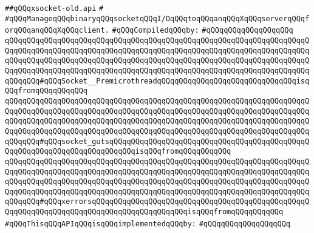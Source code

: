 \label{src/lib/x-kit/xclient/src/wire/xsocket-old.api}
\verb|##qQQqxsocket-old.api|\newline
\verb|#|\newline
\verb|#qQQqManageqQQqbinaryqQQqsocketqQQqI/OqQQqtoqQQqanqQQqXqQQqserverqQQqforqQQqanqQQqXqQQqclient.|\newline
\newline
\verb|#qQQqCompiledqQQqby:|\newline
\verb|#qQQqqQQqqQQqqQQqqQQq|\newline
\newline
\verb|qQQqqQQqqQQqqQQqqQQqqQQqqQQqqQQqqQQqqQQqqQQqqQQqqQQqqQQqqQQqqQQqqQQqqQQqqQQqqQQqqQQqqQQqqQQqqQQqqQQqqQQqqQQqqQQqqQQqqQQqqQQqqQQqqQQqqQQqqQQqqQQqqQQqqQQqqQQqqQQqqQQqqQQqqQQqqQQqqQQqqQQqqQQqqQQqqQQqqQQqqQQqqQQqqQQqqQQqqQQqqQQqqQQqqQQqqQQqqQQqqQQqqQQqqQQqqQQqqQQqqQQqqQQqqQQqqQQqqQQqqQQqqQQq#qQQqSocket__PremicrothreadqQQqqQQqqQQqqQQqqQQqqQQqqQQqqQQqisqQQqfromqQQqqQQqqQQq|\newline
\verb|qQQqqQQqqQQqqQQqqQQqqQQqqQQqqQQqqQQqqQQqqQQqqQQqqQQqqQQqqQQqqQQqqQQqqQQqqQQqqQQqqQQqqQQqqQQqqQQqqQQqqQQqqQQqqQQqqQQqqQQqqQQqqQQqqQQqqQQqqQQqqQQqqQQqqQQqqQQqqQQqqQQqqQQqqQQqqQQqqQQqqQQqqQQqqQQqqQQqqQQqqQQqqQQqqQQqqQQqqQQqqQQqqQQqqQQqqQQqqQQqqQQqqQQqqQQqqQQqqQQqqQQqqQQqqQQqqQQqqQQqqQQqqQQq#qQQqsocket_gutsqQQqqQQqqQQqqQQqqQQqqQQqqQQqqQQqqQQqqQQqqQQqqQQqqQQqqQQqqQQqqQQqqQQqqQQqqQQqisqQQqfromqQQqqQQqqQQq|\newline
\verb|qQQqqQQqqQQqqQQqqQQqqQQqqQQqqQQqqQQqqQQqqQQqqQQqqQQqqQQqqQQqqQQqqQQqqQQqqQQqqQQqqQQqqQQqqQQqqQQqqQQqqQQqqQQqqQQqqQQqqQQqqQQqqQQqqQQqqQQqqQQqqQQqqQQqqQQqqQQqqQQqqQQqqQQqqQQqqQQqqQQqqQQqqQQqqQQqqQQqqQQqqQQqqQQqqQQqqQQqqQQqqQQqqQQqqQQqqQQqqQQqqQQqqQQqqQQqqQQqqQQqqQQqqQQqqQQqqQQqqQQqqQQqqQQq#qQQqxerrorsqQQqqQQqqQQqqQQqqQQqqQQqqQQqqQQqqQQqqQQqqQQqqQQqqQQqqQQqqQQqqQQqqQQqqQQqqQQqqQQqqQQqqQQqqQQqisqQQqfromqQQqqQQqqQQq|\newline
\verb|#qQQqThisqQQqAPIqQQqisqQQqimplementedqQQqby:|\newline
\verb|#qQQqqQQqqQQqqQQqqQQq|\newline

